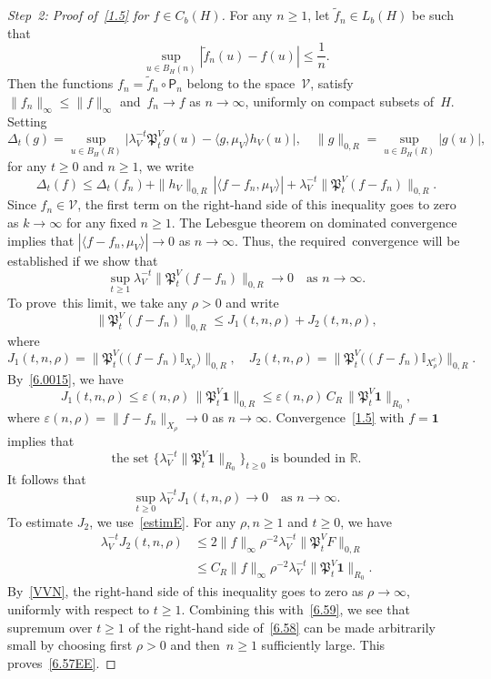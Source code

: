 \documentclass[AHL,Unicode,longabstracts]{cedram}
\newcommand{\e}{\varepsilon}
\newcommand{\mek}{{\mathbf 1}}
\newcommand{\R}{{\mathbb R}}
\newcommand{\I}{{\mathbb I}}
\newcommand{\VV}{{\mathcal V}}
\newcommand{\la}{\lambda}
\newcommand{\PPPP}{{\mathfrak P}}
\newenvironment{step}{\begin{proof}}{\let\qed\relax \end{proof}}
\begin{document}
\begin{step}[Step~2: Proof of~\eqref{1.5} for $f\in C_b(H)$]
For any $n\ge1$, let $\tilde f_n\in L_b(H)$ be such that
\[
\sup_{u\in B_H(n)}|\tilde f_n(u)-f(u)|\le\frac1n.
\]
Then the functions $f_n={\tilde f}_n\circ{\mathsf P}_n$ belong to the space~$\VV$, satisfy $\|f_n\|_\infty\le \|f\|_\infty$ and~$f_n\to f$ as $n\to\infty$, uniformly on compact subsets of~$H$. Setting
\[
\Delta_t(g)=\sup_{u\in B_H(R)}\bigl|\lambda_V^{-t}\PPPP_t^Vg(u)-\langle g,\mu_V\rangle h_V(u)\bigr|,
\quad \|g\|_{0,R}=\sup_{u\in B_H(R)}|g(u)|,
\]
for any $t\ge0$ and $n\ge1$, we write
\[
\Delta_t(f)\le \Delta_t(f_n)+\|h_V\|_{0,R}\,|\langle f-f_n,\mu_V\rangle|+\lambda_V^{-t}\|\PPPP_t^V(f-f_n)\|_{0,R}.
\]
Since $f_n\in\VV$, the first term on the right-hand side of this inequality goes to zero as $k\to\infty$ for any fixed $n\ge1$. The Lebesgue theorem on dominated convergence implies that $|\langle f-f_n,\mu_V\rangle|\to0$ as $n\to\infty$. Thus, the required~convergence will be established if we show that
\begin{equation}\label{6.57EE}
\sup_{t\ge 1}\lambda_V^{-t}\|\PPPP_t^V(f-f_n)\|_{0,R}\to0\quad\mbox{as $n\to\infty$}.
\end{equation}
To prove~this limit, we take any $\rho>0$ and write
\begin{equation}\label{6.58}
\|\PPPP_t^V(f-f_n)\|_{0,R}\le J_1(t,n,\rho)+J_2(t,n,\rho),
\end{equation}
where
\[
J_1(t,n,\rho)=\|\PPPP_t^V\bigl((f-f_n)\I_{X_\rho}\bigr)\bigr\|_{0,R}, \quad J_2(t,n,\rho)=\|\PPPP_t^V\bigl((f-f_n)\I_{X_\rho^c}\bigr)\|_{0,R}.
\]
By~\eqref{6.0015}, we have
\[
J_1(t,n,\rho)\le \e(n,\rho)\,\|\PPPP_t^V\mathbf1\|_{0,R} \le \e(n,\rho)\,C_R \,\|\PPPP_t^V\mathbf1\|_{R_0},
\]
where $\e(n,\rho)=\|f-f_n\|_{X_\rho}\to0$ as $n\to\infty$. Convergence~\eqref{1.5} with $f=\mathbf1$ implies that
\begin{equation}\label{VVN}
\text{the set $\{\lambda_V^{-t}\|\PPPP_t^V{\mek }\|_{R_0}\}_{t\ge0}$ is bounded in $\R$.}
\end{equation}
It follows that
\begin{equation}\label{6.59}
\sup_{t\ge 0}\lambda_V^{-t}J_1(t,n,\rho) \to0\quad\mbox{as $n\to\infty$}.
\end{equation}
To estimate $J_2$, we use~\eqref{estimE}. For any $ \rho,n \ge1$ and $t\ge0$, we have
\begin{align*}
\la_V^{-t}J_2(t,n,\rho) &\le 2\|f\|_\infty \rho ^{-2} \la_V^{-t} \|\PPPP_t^V F \|_{0,R}\\
&\le C_R\|f\|_\infty \rho ^{-2} \la_V^{-t}\|\PPPP_t^V{\mathbf1}\|_{R_0}.
\end{align*}
By~\eqref{VVN}, the right-hand side of this inequality goes to zero as $\rho\to\infty$, uniformly with respect to $t\ge1$. Combining this with~\eqref{6.59}, we see that supremum over $t\ge 1$ of the right-hand side of~\eqref{6.58} can be made arbitrarily small by choosing first $\rho>0$ and then~$n\ge1$ sufficiently large. This proves~\eqref{6.57EE}.
\end{step}
\end{document}
